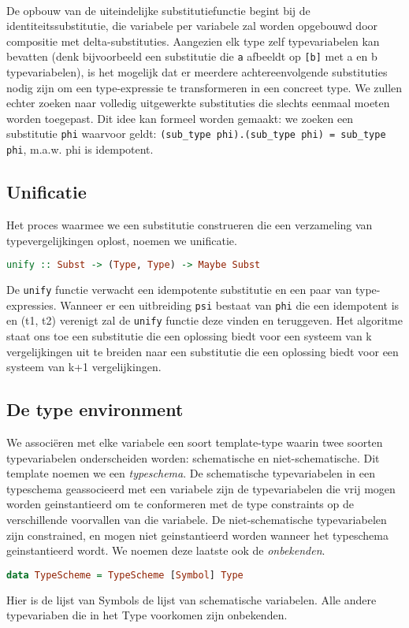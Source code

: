 \documentclass[a4paper,10pt]{article}
\begin{document}
\paragraph{}
De opbouw van de uiteindelijke substitutiefunctie begint bij de identiteitssubstitutie, die variabele per variabele zal worden opgebouwd door compositie met delta-substituties.
Aangezien elk type zelf typevariabelen kan bevatten (denk bijvoorbeeld een substitutie die \texttt{a} afbeeldt op \texttt{[b]} met a en b typevariabelen), is het mogelijk dat er meerdere achtereenvolgende substituties nodig zijn om een type-expressie te transformeren in een concreet type.
We zullen echter zoeken naar volledig uitgewerkte substituties die slechts eenmaal moeten worden toegepast.
Dit idee kan formeel worden gemaakt: we zoeken een substitutie \texttt{phi} waarvoor geldt:
\texttt{(sub\_type phi).(sub\_type phi) = sub\_type phi}, m.a.w. phi is idempotent.

\subsection{Unificatie}
Het proces waarmee we een substitutie construeren die een verzameling van typevergelijkingen oplost, noemen we unificatie.
\begin{lstlisting}[language=Haskell,frame=single]
unify :: Subst -> (Type, Type) -> Maybe Subst
\end{lstlisting}
De \texttt{unify} functie verwacht een idempotente substitutie en een paar van type-expressies.
Wanneer er een uitbreiding \texttt{psi} bestaat van \texttt{phi} die een idempotent is en (t1, t2) verenigt zal de \texttt{unify} functie deze vinden en teruggeven.
Het algoritme staat ons toe een substitutie die een oplossing biedt voor een systeem van k vergelijkingen uit te breiden naar een substitutie die een oplossing biedt voor een systeem van k+1 vergelijkingen.

\subsection{De type environment}
We associ{\"e}ren met elke variabele een soort template-type waarin twee soorten typevariabelen onderscheiden worden: schematische en niet-schematische.
Dit template noemen we een \emph{typeschema}.
De schematische typevariabelen in een typeschema geassocieerd met een variabele zijn de typevariabelen die vrij mogen worden geinstantieerd om te conformeren met de type constraints op de verschillende voorvallen van die variabele.
De niet-schematische typevariabelen zijn constrained, en mogen niet geinstantieerd worden wanneer het typeschema geinstantieerd wordt.
We noemen deze laatste ook de \emph{onbekenden}.
\begin{lstlisting}[language=Haskell,frame=single]
data TypeScheme = TypeScheme [Symbol] Type
\end{lstlisting}
Hier is de lijst van Symbols de lijst van schematische variabelen.
Alle andere typevariaben die in het Type voorkomen zijn onbekenden.
\end{document}
